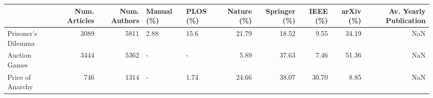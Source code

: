 \begin{tabular}{lrrllrrrrr}
\toprule
{} &  Num. Articles &  Num. Authors & Manual (\%) & PLOS (\%) &  Nature (\%) &  Springer (\%) &  IEEE (\%) &  arXiv (\%) &  Av. Yearly Publication \\
\midrule
Prisoner's Dilemma &           3089 &          5811 &       2.88 &     15.6 &       21.79 &         18.52 &      9.55 &      34.19 &                     NaN \\
Auction Games      &           3444 &          5362 &          - &        - &        5.89 &         37.63 &      7.46 &      51.36 &                     NaN \\
Price of Anarchy   &            746 &          1314 &          - &     1.74 &       24.66 &         38.07 &     30.70 &       8.85 &                     NaN \\
\bottomrule
\end{tabular}

